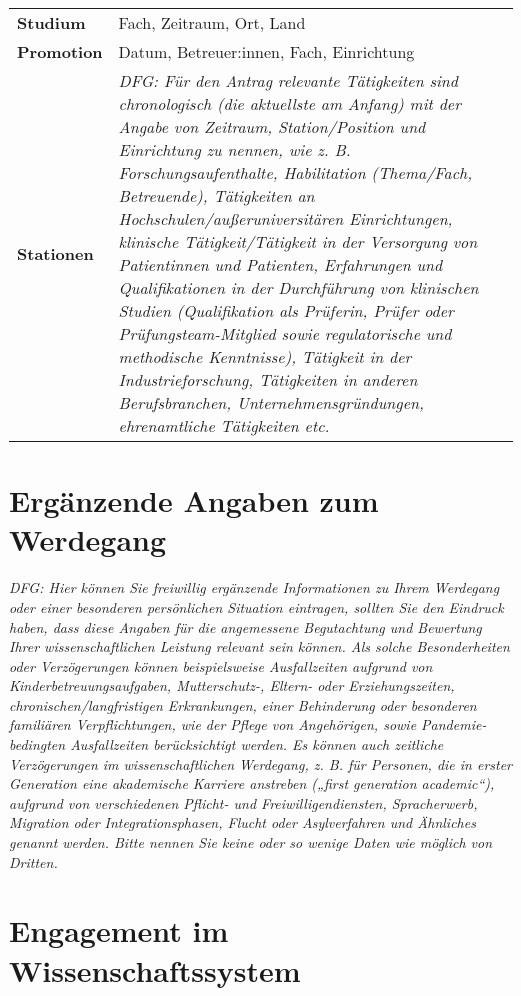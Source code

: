 \documentclass[a4paper,11pt]{article}
\begin{document}
\noindent
\begin{tabularx}{\textwidth}{@{}lX}
  \textbf{Studium} & Fach, Zeitraum, Ort, Land \\
  \textbf{Promotion} & Datum, Betreuer:innen, Fach, Einrichtung\\
  \textbf{Stationen} & \emph{DFG: Für den Antrag relevante Tätigkeiten sind chronologisch (die aktuellste am Anfang) mit der Angabe von Zeitraum, Station/Position und Einrichtung zu nennen, wie z. B. Forschungsaufenthalte, Habilitation (Thema/Fach, Betreuende), Tätigkeiten an Hochschulen/außeruniversitären Einrichtungen, klinische Tätigkeit/Tätigkeit in der Versorgung von Patientinnen und Patienten, Erfahrungen und Qualifikationen in der Durchführung von klinischen Studien (Qualifikation als Prüferin, Prüfer oder Prüfungsteam-Mitglied sowie regulatorische und methodische Kenntnisse), Tätigkeit in der Industrieforschung, Tätigkeiten in anderen Berufsbranchen, Unternehmensgründungen, ehrenamtliche Tätigkeiten etc.}
\end{tabularx}

\section*{Ergänzende Angaben zum Werdegang}

\emph{DFG: Hier können Sie freiwillig ergänzende Informationen zu
  Ihrem Werdegang oder einer besonderen persönlichen Situation
  eintragen, sollten Sie den Eindruck haben, dass diese Angaben für
  die angemessene Begutachtung und Bewertung Ihrer wissenschaftlichen
  Leistung relevant sein können. Als solche Besonderheiten oder
  Verzögerungen können beispielsweise Ausfallzeiten aufgrund von
  Kinderbetreuungsaufgaben, Mutterschutz-, Eltern- oder
  Erziehungszeiten, chronischen/langfristigen Erkrankungen, einer
  Behinderung oder besonderen familiären Verpflichtungen, wie der
  Pflege von Angehörigen, sowie Pandemie-bedingten Ausfallzeiten
  berücksichtigt werden. Es können auch zeitliche Verzögerungen im
  wissenschaftlichen Werdegang, z. B. für Personen, die in erster
  Generation eine akademische Karriere anstreben („first generation
  academic“), aufgrund von verschiedenen Pflicht- und
  Freiwilligendiensten, Spracherwerb, Migration oder
  Integrationsphasen, Flucht oder Asylverfahren und Ähnliches genannt
  werden. Bitte nennen Sie keine oder so wenige Daten wie möglich von
  Dritten. }

\section*{Engagement im Wissenschaftssystem}%
\end{document}
